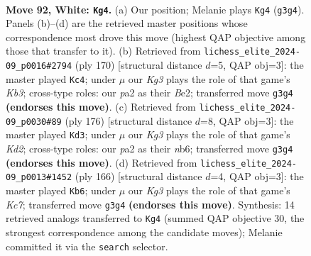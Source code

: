 \documentclass[11pt]{article}
\begin{document}
\clearpage

\begin{figure}[p]\centering
\begin{subfigure}{0.46\textwidth}\centering
\resizebox{\linewidth}{!}{%
\newchessgame
\chessboard[
  setfen={8/8/8/8/2p1k3/3p2K1/p7/8 w - - 2 92},
  showmover=false,
  pgfstyle=straightmove, color=movearrow, markmove={g3-g4}
]}
\caption{}
\end{subfigure}\hfill
\begin{subfigure}{0.46\textwidth}\centering
\resizebox{\linewidth}{!}{%
\newchessgame
\chessboard[
  setfen={8/8/8/b7/8/1K2p3/4Bpk1/8 w - - 6 86},
  showmover=false,
  pgfstyle=straightmove, color=movearrow, markmove={b3-c4}
]}
\caption{}
\end{subfigure}
\\[4pt]
\begin{subfigure}{0.46\textwidth}\centering
\resizebox{\linewidth}{!}{%
\newchessgame
\chessboard[
  setfen={8/8/1n6/8/8/1k6/p2K4/8 w - - 0 89},
  showmover=false,
  pgfstyle=straightmove, color=movearrow, markmove={d2-d3}
]}
\caption{}
\end{subfigure}\hfill
\begin{subfigure}{0.46\textwidth}\centering
\resizebox{\linewidth}{!}{%
\newchessgame
\chessboard[
  setfen={8/2K5/p7/3kp3/8/8/8/8 w - - 0 84},
  showmover=false,
  pgfstyle=straightmove, color=movearrow, markmove={c7-b6}
]}
\caption{}
\end{subfigure}
\caption{\textbf{Move 92, White: \texttt{Kg4}.} (a) Our position; Melanie plays \texttt{Kg4} (\texttt{g3g4}). Panels (b)--(d) are the retrieved master positions whose correspondence most drove this move (highest QAP objective among those that transfer to it). (b) Retrieved from \texttt{lichess\_elite\_2024-09\_p0016\#2794} (ply 170) [structural distance $d$=5, QAP obj=3]: the master played \texttt{Kc4}; under $\mu$ our \emph{Kg3} plays the role of that game's \emph{Kb3}; cross-type roles: our \emph{p}a2 as their \emph{B}e2; transferred move \texttt{g3g4} \textbf{(endorses this move)}. (c) Retrieved from \texttt{lichess\_elite\_2024-09\_p0030\#89} (ply 176) [structural distance $d$=8, QAP obj=3]: the master played \texttt{Kd3}; under $\mu$ our \emph{Kg3} plays the role of that game's \emph{Kd2}; cross-type roles: our \emph{p}a2 as their \emph{n}b6; transferred move \texttt{g3g4} \textbf{(endorses this move)}. (d) Retrieved from \texttt{lichess\_elite\_2024-09\_p0013\#1452} (ply 166) [structural distance $d$=4, QAP obj=3]: the master played \texttt{Kb6}; under $\mu$ our \emph{Kg3} plays the role of that game's \emph{Kc7}; transferred move \texttt{g3g4} \textbf{(endorses this move)}. Synthesis: 14 retrieved analogs transferred to \texttt{Kg4} (summed QAP objective 30, the strongest correspondence among the candidate moves); Melanie committed it via the \texttt{search} selector.}
\label{fig:thought-m182}
\end{figure}
\end{document}
